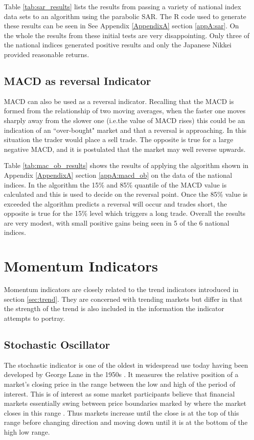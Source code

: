 Table \ref{tab:sar_results} lists the results from passing a variety of national index data sets to an algorithm using the parabolic SAR. The R code used to generate these results can be seen in See Appendix \ref{AppendixA} section \ref{appA:sar}. On the whole the results from these initial tests are very disappointing. Only three of the national indices generated positive results and only the Japanese Nikkei provided reasonable returns.



\subsection{MACD as reversal Indicator}
MACD can also be used as a reversal indicator. Recalling that the MACD is formed from the relationship of two moving averages, when the faster one moves sharply away from the slower one (i.e.the value of MACD rises) this could be an indication of an \textquotedblleft over-bought" market and that a reversal is approaching. In this situation the trader would place a sell trade. The opposite is true for a large negative MACD, and it is postulated that the market may well reverse upwards. 

Table \ref{tab:mac_ob_results} shows the results of applying the algorithm shown in Appendix \ref{AppendixA} section \ref{appA:macd_ob} on the data of the national indices. In the algorithm the 15\% and 85\% quantile of the MACD value is calculated and this is used to decide on the reversal point. Once the 85\% value is exceeded the algorithm predicts a reversal will occur and trades short, the opposite is true for the 15\% level which triggers a long trade. Overall the results are very modest, with small positive gains being seen in 5 of the 6 national indices. 



\section{Momentum Indicators}
Momentum indicators are closely related to the trend indicators introduced in section \ref{sec:trend}. They are concerned with trending markets but differ in that the strength of the trend is also included in the information the indicator attempts to portray.

\subsection{Stochastic Oscillator}
The stochastic indicator is one of the oldest in widespread use today having been developed by George Lane in the 1950s \citep{lane1986using}. It measures the relative position of a market's closing price in the range between the low and high of the period of interest. This is of interest as some market participants believe that financial markets essentially swing between price boundaries marked by where the market closes in this range \citep{williams2011long}. Thus markets increase until the close is at the top of this range before changing direction and moving down until it is at the bottom of the high low range.

